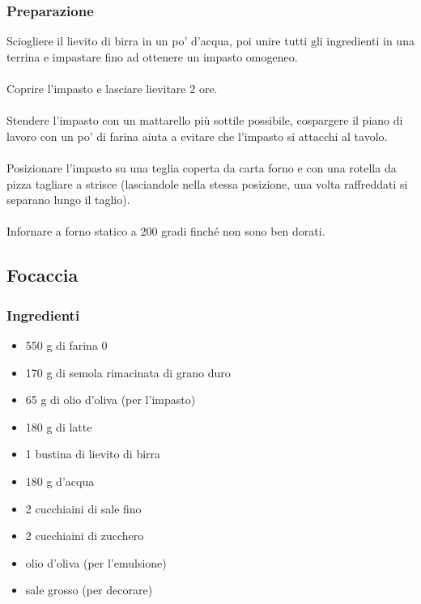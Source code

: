 \documentclass[12pt, a4paper]{article}
\begin{document}
\subsubsection{Preparazione}
	Sciogliere il lievito di birra in un po' d'acqua, poi unire tutti
	gli ingredienti in una terrina e impastare fino ad ottenere 
	un impasto omogeneo.\\\\
	Coprire l'impasto e lasciare lievitare 2 ore.\\\\
	Stendere l'impasto con un mattarello più sottile possibile,
	cospargere il piano di lavoro con un po' di farina aiuta a evitare
	che l'impasto si attacchi al tavolo.\\\\
	Posizionare l'impasto su una teglia coperta da carta forno e con
	una rotella da pizza tagliare a strisce (lasciandole nella stessa
	posizione, una volta raffreddati si separano lungo il taglio).\\\\
	Infornare a forno statico a 200 gradi finché non sono ben dorati.
\clearpage

\subsection{Focaccia}

\subsubsection{Ingredienti}
\begin{itemize}
\item	550 g di farina 0
\item	170 g di semola rimacinata di grano duro
\item	65 g di olio d'oliva (per l'impasto)
\item	180 g di latte
\item	1 bustina di lievito di birra
\item 	180 g d'acqua
\item	2 cucchiaini di sale fino
\item	2 cucchiaini di zucchero
\item	olio d'oliva (per l'emulsione)
\item	sale grosso (per decorare)
\end{itemize}
\end{document}
